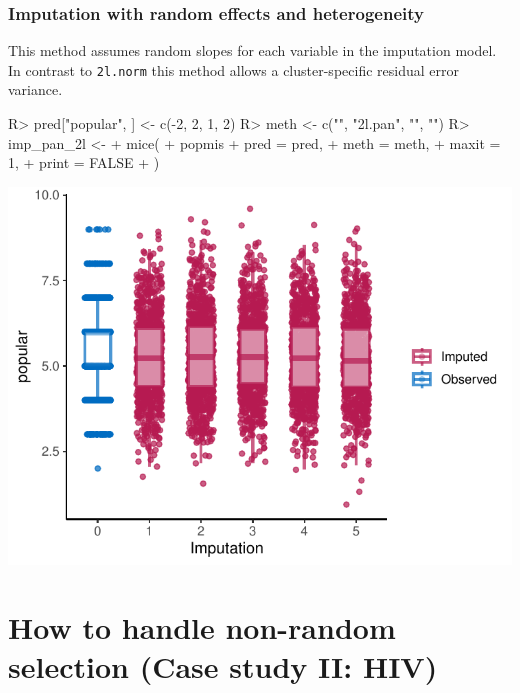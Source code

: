 \documentclass[
]{jss}
\begin{document}
\hypertarget{imputation-with-random-effects-and-heterogeneity}{%
\subsubsection{Imputation with random effects and
heterogeneity}\label{imputation-with-random-effects-and-heterogeneity}}

This method assumes random slopes for each variable in the imputation
model. In contrast to \texttt{2l.norm} this method allows a
cluster-specific residual error variance.

\begin{CodeChunk}
\begin{CodeInput}
R> pred["popular", ] <- c(-2, 2, 1, 2)
R> meth <- c("", "2l.pan", "", "")
R> imp_pan_2l <-
+   mice(
+     popmis %
+     pred = pred,
+     meth = meth,
+     maxit = 1,
+     print = FALSE
+   )
\end{CodeInput}
\end{CodeChunk}

\begin{CodeChunk}


\begin{center}\includegraphics{Imputation_of_Incomplete_Multilevel_Data_files/figure-latex/pop_pan_eval-1} \end{center}

\end{CodeChunk}

\hypertarget{how-to-handle-non-random-selection-case-study-ii-hiv}{%
\section{How to handle non-random selection (Case study II:
HIV)}\label{how-to-handle-non-random-selection-case-study-ii-hiv}}
\end{document}
